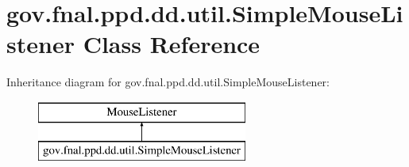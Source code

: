 \hypertarget{classgov_1_1fnal_1_1ppd_1_1dd_1_1util_1_1SimpleMouseListener}{\section{gov.\-fnal.\-ppd.\-dd.\-util.\-Simple\-Mouse\-Listener Class Reference}
\label{classgov_1_1fnal_1_1ppd_1_1dd_1_1util_1_1SimpleMouseListener}
}
Inheritance diagram for gov.\-fnal.\-ppd.\-dd.\-util.\-Simple\-Mouse\-Listener\-:\begin{figure}[H]
\begin{center}
\leavevmode
\includegraphics[height=2.000000cm]{classgov_1_1fnal_1_1ppd_1_1dd_1_1util_1_1SimpleMouseListener}
\end{center}
\end{figure}

